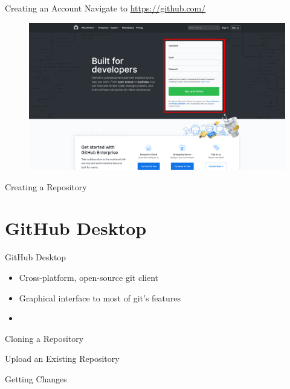 \documentclass{beamer}
\begin{document}
    \begin{frame}{Creating an Account}
        Navigate to \url{https://github.com/}

        \begin{figure}
            \centering
            \includegraphics[width=\textwidth]{figures/github.png}
        \end{figure}
    \end{frame}

    \begin{frame}{Creating a Repository}
    \end{frame}

    \section{GitHub Desktop}\label{sec:github-desktop}
    \begin{frame}{GitHub Desktop}
        \begin{itemize}
            \item Cross-platform, open-source git client
            \item Graphical interface to most of git's features
            \item
        \end{itemize}
    \end{frame}

    \begin{frame}{Cloning a Repository}
    \end{frame}

    \begin{frame}{Upload an Existing Repository}
    \end{frame}

    \begin{frame}{Getting Changes}
    \end{frame}
\end{document}
